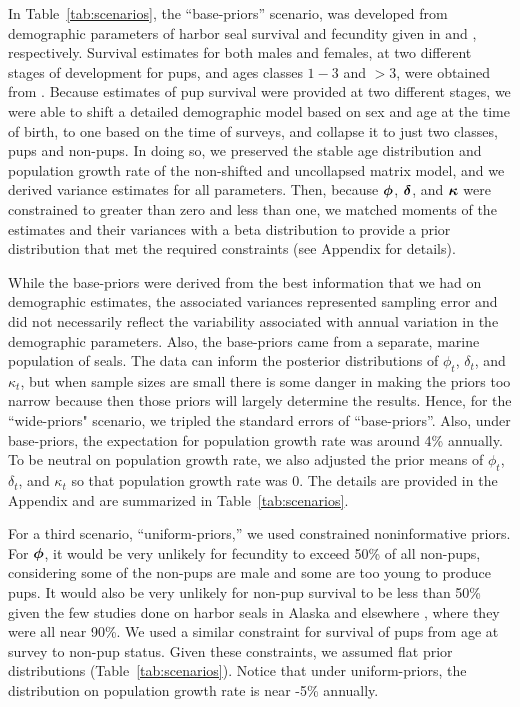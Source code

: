\documentclass[12pt, titlepage]{article}\usepackage[]{graphicx}\usepackage[]{color}
\def\bdelta{\mbox{\boldmath $\delta$}}
\def\bphi{\mbox{\boldmath $\phi$}}
\def\bkappa{\mbox{\boldmath $\kappa$}}
\begin{document}
In Table~\ref{tab:scenarios}, the ``base-priors'' scenario, was developed from demographic parameters of harbor seal survival and fecundity given in \citet{Hast:Smal:Pend:sex:2012} and \citet{Pitc:Calk:biol:1979}, respectively.  Survival estimates for both males and females, at two different stages of development for pups, and ages classes $1-3$ and $>3$, were obtained from \citet{Hast:Smal:Pend:sex:2012}.  Because estimates of pup survival were provided at two different stages, we were able to shift a detailed demographic model based on sex and age at the time of birth, to one based on the time of surveys, and collapse it to just two classes, pups and non-pups.  In doing so, we preserved the stable age distribution and population growth rate of the non-shifted and uncollapsed matrix model, and we derived variance estimates for all parameters.  Then, because $\bphi$, $\bdelta$, and $\bkappa$ were constrained to greater than zero and less than one, we matched moments of the estimates and their variances with a beta distribution to provide a prior distribution that met the required constraints (see Appendix for details).

While the base-priors were derived from the best information that we had on demographic estimates, the associated variances represented sampling error and did not necessarily reflect the variability associated with annual variation in the demographic parameters. Also, the base-priors came from a separate, marine population of seals. The data can inform the posterior distributions of $\phi_t$, $\delta_t$, and $\kappa_t$, but when sample sizes are small there is some danger in making the priors too narrow because then those priors will largely determine the results.  Hence, for the ``wide-priors" scenario, we tripled the standard errors of ``base-priors''.  Also, under base-priors, the expectation for population growth rate was around 4\% annually.  To be neutral on population growth rate, we also adjusted the prior means of $\phi_t$, $\delta_t$, and $\kappa_t$ so that population growth rate was 0.  The details are provided in the Appendix and are summarized in Table~\ref{tab:scenarios}.

For a third scenario, ``uniform-priors,'' we used constrained noninformative priors.  For $\bphi$, it would be very unlikely for fecundity to exceed 50\% of all non-pups, considering some of the non-pups are male and some are too young to produce pups.  It would also be very unlikely for non-pup survival to be less than 50\% given the few studies done on harbor seals in Alaska \citep{Hast:Smal:Pend:sex:2012} and elsewhere \citep{Hark:Heid:comp:1990,Cord:Thom:mark:2014,Mack:Durb:Midd:Thom:baye:2008}, where they were all near 90\%.  We used a similar constraint for survival of pups from age at survey to non-pup status.  Given these constraints, we assumed flat prior distributions (Table~\ref{tab:scenarios}).  Notice that under uniform-priors, the distribution on population growth rate is near -5\% annually. 
\end{document}
